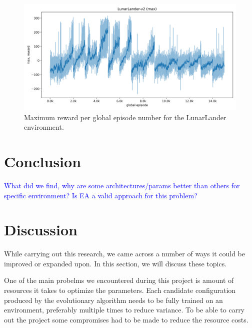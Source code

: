 \documentclass{article}
\newcommand{\TODO}[1]{\textcolor{blue}{#1}}
\begin{document}
\begin{figure}[htbp]
    \centering
    \includegraphics[width=0.9\linewidth]{figs/ll_max_rewards.png}
    \caption{
        Maximum reward per global episode number for the LunarLander environment.
    }
    \label{fig:max-ll}
\end{figure}

\section{Conclusion}
\label{sec:conc}

\TODO{
    What did we find, why are some architectures/params better than others for specific environment?
    Is EA a valid approach for this problem?
}

\section{Discussion}
\label{sec:disc}

While carrying out this research, we came across a number of ways it could be improved or expanded upon. In this section, we will discuss these topics. 

One of the main probelms we encountered during this project is amount of resources it takes to optimize the parameters. Each candidate configuration produced by the evolutionary algorithm needs to be fully trained on an environment, preferably multiple times to reduce variance. 
To be able to carry out the project some compromises had to be made to reduce the resource costs. 
\end{document}
